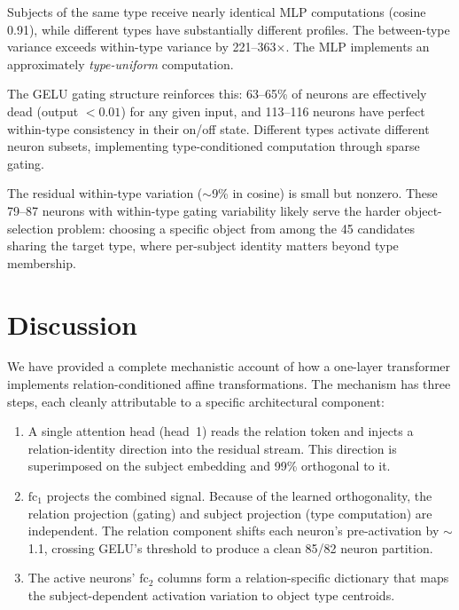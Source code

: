 \documentclass[11pt,a4paper]{article}
\newcommand{\fc}{\mathrm{fc}}
\begin{document}
\noindent Subjects of the same type receive nearly identical MLP
computations (cosine 0.91), while different types have substantially
different profiles. The between-type variance exceeds within-type
variance by 221--363$\times$. The MLP implements an approximately
\emph{type-uniform} computation.

The GELU gating structure reinforces this: 63--65\% of neurons are
effectively dead (output $< 0.01$) for any given input, and 113--116
neurons have perfect within-type consistency in their on/off state.
Different types activate different neuron subsets, implementing
type-conditioned computation through sparse gating.

The residual within-type variation ($\sim$9\% in cosine) is small but
nonzero. These 79--87 neurons with within-type gating variability
likely serve the harder object-selection problem: choosing a specific
object from among the 45 candidates sharing the target type, where
per-subject identity matters beyond type membership.

\section{Discussion}
\label{sec:discussion}

We have provided a complete mechanistic account of how a one-layer
transformer implements relation-conditioned affine transformations.
The mechanism has three steps, each cleanly attributable to a specific
architectural component:

\begin{enumerate}
\item A single attention head (head~1) reads the relation token and
  injects a relation-identity direction into the residual stream. This
  direction is superimposed on the subject embedding and 99\%
  orthogonal to it.

\item $\fc_1$ projects the combined signal. Because of the learned
  orthogonality, the relation projection (gating) and subject
  projection (type computation) are independent. The relation
  component shifts each neuron's pre-activation by $\sim$1.1,
  crossing GELU's threshold to produce a clean 85/82 neuron partition.

\item The active neurons' $\fc_2$ columns form a relation-specific
  dictionary that maps the subject-dependent activation variation to
  object type centroids.
\end{enumerate}
\end{document}
